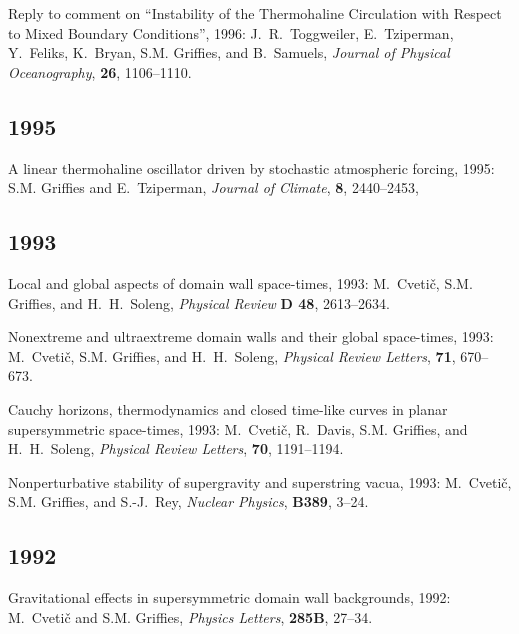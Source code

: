 \begin{etaremune}
\item Reply to comment on ``Instability of the Thermohaline Circulation with Respect to Mixed Boundary Conditions'', 1996: J.\ R.\ Toggweiler, E.\ Tziperman, Y.\ Feliks, K.\ Bryan, S.M. Grif\/f\/ies, and B.\ Samuels, {\em Journal of Physical
Oceanography}, {\bf 26}, 1106--1110.

\subsection*{\sc \color{Maroon} 1995}
  
\item A linear thermohaline oscillator driven by stochastic atmospheric forcing, 1995: S.M. Grif\/f\/ies and E.\ Tziperman, {\em Journal of Climate}, {\bf 8}, 2440--2453, 

\subsection*{\sc \color{Maroon} 1993}

\item Local and global aspects of domain wall space-times, 1993: M.\ Cveti\v c, S.M. Grif\/f\/ies, and H.\ H.\ Soleng, {\em Physical Review} {\bf D 48}, 2613--2634.

\item Nonextreme and ultraextreme domain walls and their global space-times, 1993: M.\ Cveti\v c, S.M. Grif\/f\/ies, and H.\ H.\ Soleng, {\em Physical Review Letters}, {\bf 71}, 670--673.

\item Cauchy horizons, thermodynamics and closed time-like curves in planar supersymmetric space-times, 1993: M.\ Cveti\v c, R.\ Davis, S.M. Grif\/f\/ies, and H.\ H.\ Soleng, {\em Physical Review Letters}, {\bf 70}, 1191--1194.


\item Nonperturbative stability of supergravity and superstring vacua, 1993: M.\ Cveti\v c, S.M. Grif\/f\/ies, and S.-J.\ Rey, {\em Nuclear Physics}, {\bf B389}, 3--24.

\subsection*{\sc \color{Maroon} 1992}
 
\item Gravitational effects in supersymmetric domain wall backgrounds, 1992: M.\ Cveti\v c and S.M. Grif\/f\/ies, {\em Physics Letters}, {\bf 285B}, 27--34.


\end{etaremune}
